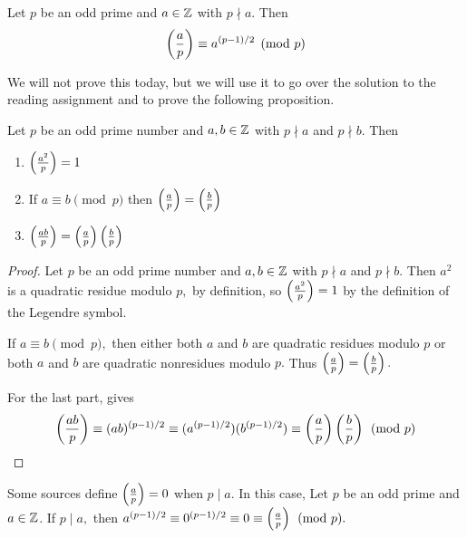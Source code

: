 \documentclass{ximera}
\begin{document}
\begin{theorem}\label{thm:euler-quads}
    Let $p$ be an odd prime and $a\in\mathbb Z$ with $p\nmid a.$ Then \[\left(\frac{a}{p}\right)\equiv a^{(p-1)/2}\pmod{p}\]
\end{theorem}

We will not prove this today, but we will use it to go over the solution to the reading assignment and to prove the following proposition.

\begin{proposition}\label{prop:legendre-facts}
	Let $p$ be an odd prime number and $a,b\in\mathbb Z$ with $p\nmid a$ and $p\nmid b.$ Then 
	\begin{enumerate}
		\item $\left(\frac{a^2}{p}\right)=1$ \label{squares-are-square}
		\item If $a\equiv b\pmod{p}$ then $\left(\frac{a}{p}\right)=\left(\frac{b}{p}\right)$ \label{legendre-respects-mod}
		\item $\left(\frac{ab}{p}\right)=\left(\frac{a}{p}\right)\left(\frac{b}{p}\right)$ \label{legendre-mult}
	\end{enumerate}
\end{proposition}


\begin{proof}
    Let $p$ be an odd prime number and $a,b\in\mathbb Z$ with $p\nmid a$ and $p\nmid b.$ Then $a^2$ is a quadratic residue modulo $p,$ by definition, so $\left(\frac{a^2}{p}\right)=1$ by the definition of the Legendre symbol.

    If $a\equiv b\pmod{p},$ then either both $a$ and $b$ are quadratic residues modulo $p$ or both $a$ and $b$ are quadratic nonresidues modulo $p.$ Thus $\left(\frac{a}{p}\right)=\left(\frac{b}{p}\right).$

    For the last part,  gives \[\left(\frac{ab}{p}\right)\equiv (ab)^{(p-1)/2}\equiv (a^{(p-1)/2})(b^{(p-1)/2})\equiv \left(\frac{a}{p}\right)\left(\frac{b}{p}\right)\pmod{p}\]
\end{proof}

\begin{remark}
	Some sources define $\left(\frac{a}{p}\right)=0$ when $p\mid a.$ In this case,  Let $p$ be an odd prime and $a\in\mathbb Z$.
	If $p\mid a,$ then $a^{(p-1)/2}\equiv 0^{(p-1)/2}\equiv 0\equiv\left(\frac{a}{p}\right)\pmod{p}.$
\end{remark}
\end{document}
